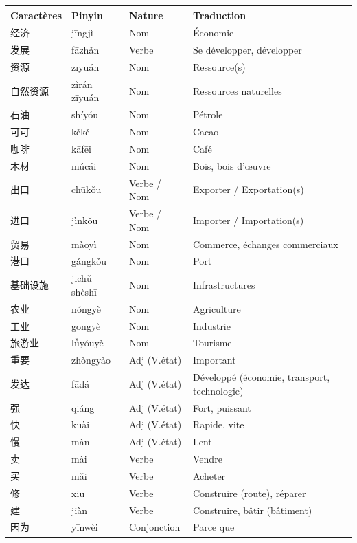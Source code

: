 \documentclass[11pt]{article}
\begin{document}
\begin{center}
\begin{tabularx}{\linewidth}{|X|X|X|X|}
\hline \rowcolor{popblueL} \textbf{Caractères} & \textbf{Pinyin} & \textbf{Nature} & \textbf{Traduction} \\ \hline
经济 & jīngjì & Nom & Économie \\ \hline
发展 & fāzhǎn & Verbe & Se développer, développer \\ \hline
资源 & zīyuán & Nom & Ressource(s) \\ \hline
自然资源 & zìrán zīyuán & Nom & Ressources naturelles \\ \hline
石油 & shíyóu & Nom & Pétrole \\ \hline
可可 & kěkě & Nom & Cacao \\ \hline
咖啡 & kāfēi & Nom & Café \\ \hline
木材 & múcái & Nom & Bois, bois d'œuvre \\ \hline
出口 & chūkǒu & Verbe / Nom & Exporter / Exportation(s) \\ \hline
进口 & jìnkǒu & Verbe / Nom & Importer / Importation(s) \\ \hline
贸易 & màoyì & Nom & Commerce, échanges commerciaux \\ \hline
港口 & gǎngkǒu & Nom & Port \\ \hline
基础设施 & jīchǔ shèshī & Nom & Infrastructures \\ \hline
农业 & nóngyè & Nom & Agriculture \\ \hline
工业 & gōngyè & Nom & Industrie \\ \hline
旅游业 & lǚyóuyè & Nom & Tourisme \\ \hline
重要 & zhòngyào & Adj (V.état) & Important \\ \hline
发达 & fādá & Adj (V.état) & Développé (économie, transport, technologie) \\ \hline
强 & qiáng & Adj (V.état) & Fort, puissant \\ \hline
快 & kuài & Adj (V.état) & Rapide, vite \\ \hline
慢 & màn & Adj (V.état) & Lent \\ \hline
卖 & mài & Verbe & Vendre \\ \hline
买 & mǎi & Verbe & Acheter \\ \hline
修 & xiū & Verbe & Construire (route), réparer \\ \hline
建 & jiàn & Verbe & Construire, bâtir (bâtiment) \\ \hline
因为 & yīnwèi & Conjonction & Parce que \\ \hline

\end{tabularx}
\end{center}
\end{document}
